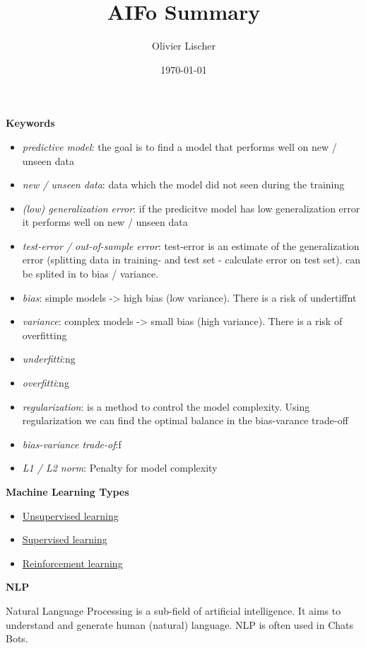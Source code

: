 \documentclass[11pt,twoside,landscape]{article}
\author{Olivier Lischer}
\date{\today}
\title{AIFo Summary}
\begin{document}
\begin{multicols}{3}

\textbf{Keywords}

\begin{itemize}
\item \emph{predictive model}: the goal is to find a model that performs well on new / unseen data
\item \emph{new / unseen data}: data which the model did not seen during the training
\item \emph{(low) generalization error}: if the predicitve model has low generalization error it performs well on new / unseen data
\item \emph{test-error / out-of-sample error}: test-error is an estimate of the generalization error (splitting data in training- and test set - calculate error on test set). can be splited in to bias / variance.
\item \emph{bias}: simple models -> high bias (low variance). There is a risk of undertiffnt
\item \emph{variance}: complex models -> small bias (high variance). There is a risk of overfitting
\item \emph{underfitti}:ng
\item \emph{overfitti}:ng
\item \emph{regularization}: is a method to control the model complexity. Using regularization we can find the optimal balance in the bias-varance trade-off
\item \emph{bias-variance trade-of}:f
\item \emph{L1 / L2 norm}: Penalty for model complexity
\end{itemize}

\textbf{Machine Learning Types}

\begin{itemize}
\item \href{../../../roam/20210924090800-unsupervised_learning.org}{Unsupervised learning}
\item \href{../../../roam/20210924091334-supervised_learning.org}{Supervised learning}
\item \href{../../../roam/20210924091935-reinforcement_learning.org}{Reinforcement learning}
\end{itemize}

\textbf{NLP}

Natural Language Processing is a sub-field of artificial intelligence.
It aims to understand and generate human (natural) language.
NLP is often used in Chats Bots.


\end{multicols}
\end{document}
